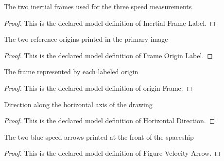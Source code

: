 \begin{definition}
  \label{def:physics:phyx-mini-0553:phyxminiproblems-problemphyxmini0553-inertialframelabel}
  The two inertial frames used for the three speed measurements
\end{definition}
\begin{proof}
  This is the declared model definition of Inertial Frame Label.
\end{proof}
\begin{definition}
  \label{def:physics:phyx-mini-0553:phyxminiproblems-problemphyxmini0553-frameoriginlabel}
  The two reference origins printed in the primary image
\end{definition}
\begin{proof}
  This is the declared model definition of Frame Origin Label.
\end{proof}
\begin{definition}
  \label{def:physics:phyx-mini-0553:phyxminiproblems-problemphyxmini0553-originframe}
  The frame represented by each labeled origin
\end{definition}
\begin{proof}
  This is the declared model definition of origin Frame.
\end{proof}
\begin{definition}
  \label{def:physics:phyx-mini-0553:phyxminiproblems-problemphyxmini0553-horizontaldirection}
  Direction along the horizontal axis of the drawing
\end{definition}
\begin{proof}
  This is the declared model definition of Horizontal Direction.
\end{proof}
\begin{definition}
  \label{def:physics:phyx-mini-0553:phyxminiproblems-problemphyxmini0553-figurevelocityarrow}
  The two blue speed arrows printed at the front of the spaceship
\end{definition}
\begin{proof}
  This is the declared model definition of Figure Velocity Arrow.
\end{proof}
